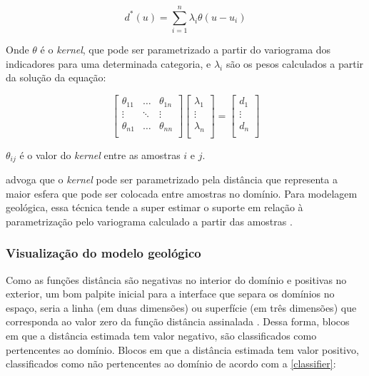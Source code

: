 \begin{equation}
\label{estimador}
d^*(u)=\sum_{i=1}^{n} \lambda_i \theta(u - u_i)
\end{equation}

Onde $\theta$ é o \textit{kernel}, que pode ser parametrizado a partir do variograma dos indicadores para uma determinada categoria, e $\lambda_i$ são os pesos calculados a partir da solução da equação:

\begin{equation}
    \label{rbf_sist}
    \begin{bmatrix} 
    \theta_{11}&\dots&\theta_{1n}\\
    \vdots&\ddots&\vdots\\
    \theta_{n1}&\dots&\theta_{nn}\\ 
    \end{bmatrix}
    \begin{bmatrix} 
    \lambda_{1}\\
    \vdots\\
    \lambda_{n}\\ 
    \end{bmatrix}
    =
    \begin{bmatrix} 
    d_{1}\\
    \vdots\\
    d_{n}\\ 
    \end{bmatrix}
\end{equation}

$\theta_{ij}$ é o valor do \textit{kernel} entre as amostras $i$ e $j$.

 advoga que o \textit{kernel} pode ser parametrizado pela distância que representa a maior esfera que pode ser colocada entre amostras no domínio. Para modelagem geológica, essa técnica tende a super estimar o suporte em relação à parametrização pelo variograma calculado a partir das amostras \cite{martin2017implicitmodeling}.

\subsubsection{Visualização do modelo geológico}

Como as funções distância são negativas no interior do domínio e positivas no exterior, um bom palpite inicial para a interface que separa os domínios no espaço, seria a linha (em duas dimensões) ou superfície (em três dimensões) que corresponda ao valor zero da função distância assinalada \cite{wildedeutschcalibrate}. Dessa forma, blocos em que a distância estimada tem valor negativo, são classificados como pertencentes ao domínio. Blocos em que a distância estimada tem valor positivo, classificados como não pertencentes ao domínio de acordo com a \autoref{classifier}:

